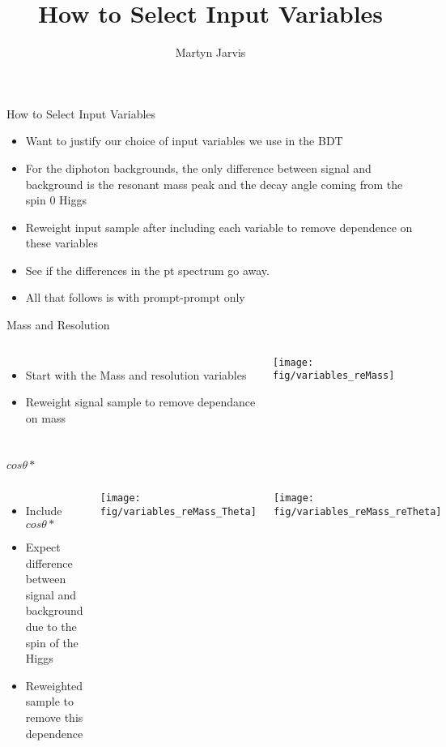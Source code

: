 \documentclass[t]{beamer}
\author{Martyn Jarvis}
\title[Input Variables]{How to Select Input Variables}
\begin{document}


\begin{frame}{How to Select Input Variables}
  \begin{itemize}  
   \item Want to justify our choice of input variables we use in the BDT
   \item For the diphoton backgrounds, the only difference between signal 
   and background is the resonant mass peak and the decay angle coming from
   the spin 0 Higgs
   \item Reweight input sample after including each variable to remove
   dependence on these variables 
   \item See if the differences in the pt spectrum go away.
   \item All that follows is with prompt-prompt only
   \end{itemize}
\end{frame}

\begin{frame}{Mass and Resolution}
  \begin{columns}[c]
  \begin{itemize}
    \item Start with the Mass and resolution variables
    \item Reweight signal sample to remove dependance on mass
  \end{itemize}
   
    \texttt{[image: fig/variables\_reMass]}
  \end{columns}
\end{frame}

\begin{frame}{$cos\theta*$}
  \begin{columns}[c]
  \begin{itemize}
    \item Include $cos\theta*$
    \item Expect difference between signal and background due to the spin of the Higgs
    \item Reweighted sample to remove this dependence
  \end{itemize}
    \texttt{[image: fig/variables\_reMass\_Theta]}
  
    \texttt{[image: fig/variables\_reMass\_reTheta]}
  \end{columns}
\end{frame}
\end{document}
